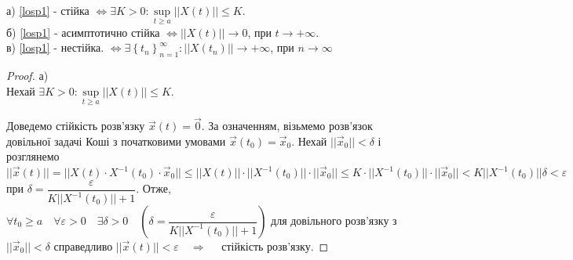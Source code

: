 \documentclass[14pt,a4paper]{scrartcl}
\theoremstyle{definition}
\theoremstyle{definition}
\theoremstyle{definition}
\begin{document}
\begin{spacing}{2.5}
  \begin{boxteo}\quad \\
  а) \eqref{losp1} - стійка $\Longleftrightarrow \exists K > 0: \sup\limits_{t\geq  a} ||X(t) || \leq K$.\\
  б) \eqref{losp1} - асимптотично стійка $\Longleftrightarrow  ||X(t)|| \to 0 $, при $ t \to +\infty$.\\
  в) \eqref{losp1} - нестійка. $ \Longleftrightarrow \exists \left\lbrace t_n \right\rbrace_{n=1}^{\infty} : ||X(t_n)|| \to +\infty $, при $n \to \infty$
  \end{boxteo}
\end{spacing}

\begin{spacing}{2.25}
\begin{proof}
а) \fbox{$\Longleftarrow$} \\ Нехай $ \exists K > 0 : \sup\limits_{t\geq a} ||X(t)|| \leq K$.

Доведемо стійкість розв'язку $\overrightarrow{x} (t) = \overrightarrow{0}.$ За означенням, візьмемо розв'язок довільної задачі Коші з початковими умовами $\overrightarrow{x } (t_0) = \overrightarrow{x}_0$.
Нехай $|| \overrightarrow{x}_0 || < \delta$ і розглянемо $ || \overrightarrow{x} (t)|| = || X(t) \cdot X^{-1} (t_0) \cdot \overrightarrow{x}_0 || \leq ||X(t)|| \cdot || X^{-1} (t_0)|| \cdot || \overrightarrow{x}_0|| \leq K \cdot || X^{-1} (t_0)|| \cdot || \overrightarrow{x}_0|| < K || X^{-1} (t_0)||\delta < \varepsilon $ при $ \delta = \dfrac{\varepsilon }{K || X^{-1} (t_0)|| + 1} $.
Отже, $\forall t_0 \geq  a \quad \forall \varepsilon >0 \quad \exists \delta > 0 \quad \left(  \delta = \dfrac{\varepsilon }{K || X^{-1} (t_0)|| + 1}  \right)$  для довільного розв'язку з $ || \overrightarrow{x}_0|| < \delta$ справедливо $ ||\overrightarrow{x} (t)|| < \varepsilon  \quad \Longrightarrow \quad $ стійкість розв'язку.
\end{proof}
\end{spacing}
\end{document}
